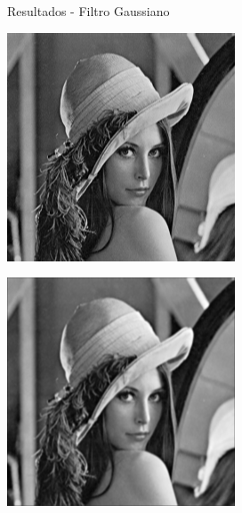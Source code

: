 \documentclass{beamer}
\begin{document}
\begin{frame}[fragile]{Resultados - Filtro Gaussiano}
	\vspace{0.5cm}
	\centering
	\begin{minipage}{0.32\linewidth}
		\centering
		\includegraphics[width=\linewidth]{../results/lena_original}
		\label{fig:lenaoriginal10d}
	\end{minipage}\hfill
	\begin{minipage}{0.32\linewidth}
		\centering
		\includegraphics[width=\linewidth]{../results/lena_ej10d1}

\end{minipage}
\end{frame}
\end{document}

